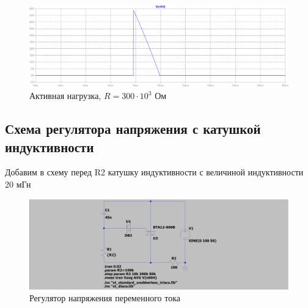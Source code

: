 \documentclass[a4paper, 12pt]{article}
\begin{document}
    \begin{figure}[H]
        \centering
        \includegraphics[scale=0.45]{R2-300k.png}
        \captionsetup{skip=0pt}
        \caption{Активная нагрузка, $R=300\cdot10^3$ Ом}
        \label{fig:R2-300k}
    \end{figure}
    \vfill


    \subsection{Схема регулятора напряжения с катушкой индуктивности}
    Добавим в схему перед R2 катушку индуктивности с величиной индуктивности 20 мГн
    \begin{figure}[H]
        \centering
        \includegraphics[scale=0.22]{scheme5.png}
        \captionsetup{skip=0pt}
        \caption{Регулятор напряжения переменного тока}
        \label{fig:scheme5}
    \end{figure}
\end{document}
